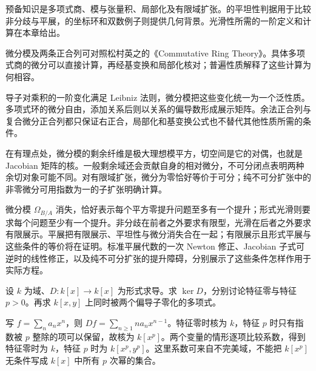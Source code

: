\ProseParagraphBreak

预备知识是多项式商、模与张量积、局部化及有限域扩张。的平坦性判据用于比较非分歧与平展，的坐标环和双数例子则提供几何背景。光滑性所需的一阶定义和计算在本章给出。

\ProseParagraphBreak
微分模及两条正合列可对照松村英之的《Commutative Ring Theory》\cite[\S25, pp. 191--195]{Matsumura1989CommutativeRingTheory}。具体多项式商的微分可以直接计算，再经基变换和局部化核对；普遍性质解释了这些计算为何相容。








\begin{chaptersummary}
	导子对乘积的一阶变化满足 Leibniz 法则，微分模把这些变化统一为一个泛性质。多项式环的微分自由，添加关系后则以关系的偏导数形成展示矩阵。余法正合列与复合微分正合列都只保证右正合，局部化和基变换公式也不替代其他性质所需的条件。

	\ProseParagraphBreak
	在有理点处，微分模的剩余纤维是极大理想模平方，切空间是它的对偶，也就是 Jacobian 矩阵的核。一般剩余域还会贡献自身的相对微分，不可分闭点表明两种余切对象可能不同。对有限域扩张，微分为零恰好等价于可分；纯不可分扩张中的非零微分可用指数为一的子扩张明确计算。

	\ProseParagraphBreak
	微分模 \(\Omega_{B/A}\) 消失，恰好表示每个平方零提升问题至多有一个提升；形式光滑则要求每个问题至少有一个提升。非分歧在前者之外要求有限型，光滑在后者之外要求有限展示。平展把有限展示、平坦性与微分消失合在一起；有限展示且形式平展与这些条件的等价将在证明。标准平展代数的一次 Newton 修正、Jacobian 子式可逆时的线性修正，以及纯不可分扩张的提升障碍，分别展示了这些条件怎样作用于实际方程。
\end{chaptersummary}

\BookExercises

\begin{exercise}\label{b3:ex:14-derivation-constants}
	设 \(k\) 为域、\(D:k[x]\to k[x]\) 为形式求导。求 \(\ker D\)，分别讨论特征零与特征 \(p>0\)。再求 \(k[x,y]\) 上同时被两个偏导子零化的多项式。
\end{exercise}
\begin{solution}
	写 \(f=\sum_na_nx^n\)，则 \(Df=\sum_{n\ge1}na_nx^{n-1}\)。特征零时核为 \(k\)，特征 \(p\) 时只有指数被 \(p\) 整除的项可以保留，故核为 \(k[x^p]\)。两个变量的情形逐项比较系数，得到特征零时为 \(k\)，特征 \(p\) 时为 \(k[x^p,y^p]\)。这里系数可来自不完美域，不能把 \(k[x^p]\) 无条件写成 \(k[x]\) 中所有 \(p\) 次幂的集合。
\end{solution}

